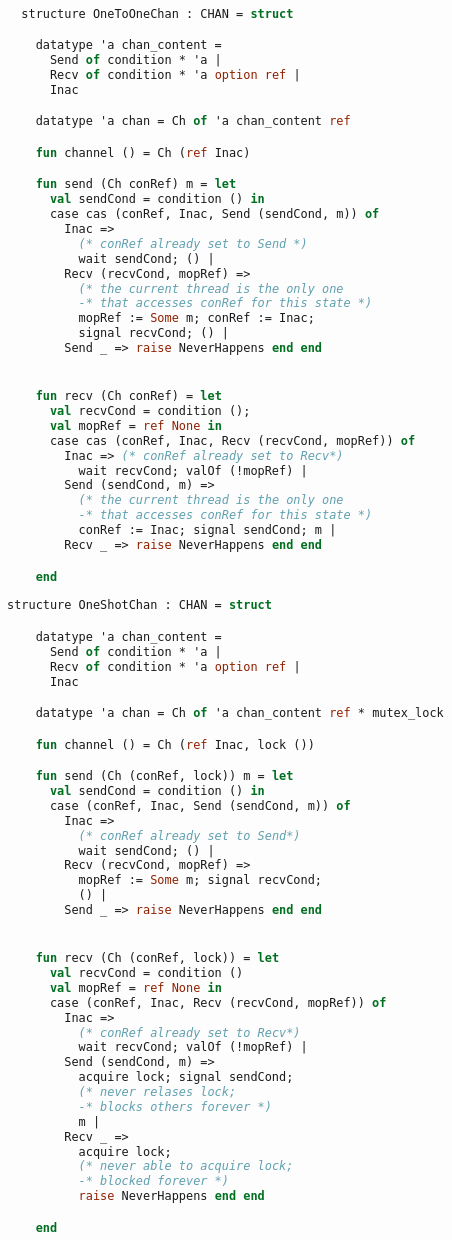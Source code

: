 \documentclass{article}
\begin{document}
  \begin{lstlisting}[language=ML, style=codestyle1]

  structure OneToOneChan : CHAN = struct

    datatype 'a chan_content =
      Send of condition * 'a |
      Recv of condition * 'a option ref |
      Inac  

    datatype 'a chan = Ch of 'a chan_content ref

    fun channel () = Ch (ref Inac)

    fun send (Ch conRef) m = let
      val sendCond = condition () in
      case cas (conRef, Inac, Send (sendCond, m)) of
        Inac => 
          (* conRef already set to Send *)
          wait sendCond; () |
        Recv (recvCond, mopRef) =>
          (* the current thread is the only one
          -* that accesses conRef for this state *)
          mopRef := Some m; conRef := Inac;
          signal recvCond; () |
        Send _ => raise NeverHappens end end


    fun recv (Ch conRef) = let
      val recvCond = condition ();
      val mopRef = ref None in
      case cas (conRef, Inac, Recv (recvCond, mopRef)) of
        Inac => (* conRef already set to Recv*)
          wait recvCond; valOf (!mopRef) |
        Send (sendCond, m) =>
          (* the current thread is the only one
          -* that accesses conRef for this state *)
          conRef := Inac; signal sendCond; m |
        Recv _ => raise NeverHappens end end 

    end
  \end{lstlisting}

  \begin{lstlisting}[language=ML, style=codestyle1]
    structure OneShotChan : CHAN = struct

    datatype 'a chan_content =
      Send of condition * 'a |
      Recv of condition * 'a option ref |
      Inac  

    datatype 'a chan = Ch of 'a chan_content ref * mutex_lock

    fun channel () = Ch (ref Inac, lock ())

    fun send (Ch (conRef, lock)) m = let
      val sendCond = condition () in
      case (conRef, Inac, Send (sendCond, m)) of
        Inac =>
          (* conRef already set to Send*)
          wait sendCond; () |
        Recv (recvCond, mopRef) =>
          mopRef := Some m; signal recvCond;
          () |
        Send _ => raise NeverHappens end end


    fun recv (Ch (conRef, lock)) = let
      val recvCond = condition ()
      val mopRef = ref None in
      case (conRef, Inac, Recv (recvCond, mopRef)) of
        Inac =>
          (* conRef already set to Recv*)
          wait recvCond; valOf (!mopRef) |
        Send (sendCond, m) =>
          acquire lock; signal sendCond;
          (* never relases lock;
          -* blocks others forever *)
          m |
        Recv _ =>
          acquire lock;
          (* never able to acquire lock;
          -* blocked forever *)
          raise NeverHappens end end

    end
  \end{lstlisting}
\end{document}
